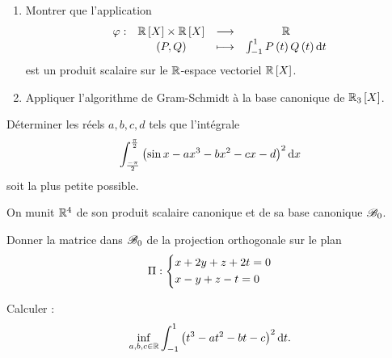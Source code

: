 \begin{corr}
\end{corr}

\begin{exo}[Exercice 3]
\begin{enumerate}
\item Montrer que l'application \[\fonction{\phi}{\poly[\R]\times\poly[\R]}{\R}{\paren{P,Q}}{\int_{-1}^1P\paren{t}Q\paren{t}\odif{t}}\] est un produit scalaire sur le \(\mathbb{R}\)-espace vectoriel \(\poly[\R]\). \\

\item Appliquer l'algorithme de Gram-Schmidt à la base canonique de \(\polydeg[\R]{3}\).
\end{enumerate}
\end{exo}

\begin{corr}
\end{corr}

\begin{exo}
Déterminer les réels \(a,b,c,d\) tels que l'intégrale \[\int_{\frac{-\pi}{2}}^{\frac{\pi}{2}}\paren{\sin x-ax^3-bx^2-cx-d}^2\odif{x}\] soit la plus petite possible.
\end{exo}

\begin{corr}
\end{corr}

\begin{exo}
On munit \(\mathbb{R}^4\) de son produit scalaire canonique et de sa base canonique \(\mathscr{B}_0\).

Donner la matrice dans \(\mathscr{B}_0\) de la projection orthogonale sur le plan \[\Pi:\begin{dcases}
x+2y+z+2t=0 \\
x-y+z-t=0
\end{dcases}\]
\end{exo}

\begin{corr}
\end{corr}

\begin{exo}[Exercice 6]
Calculer : \[\inf_{a,b,c\in\R}\int_{-1}^1\paren{t^3-at^2-bt-c}^2\odif{t}.\]
\end{exo}

\begin{corr}
\end{corr}

